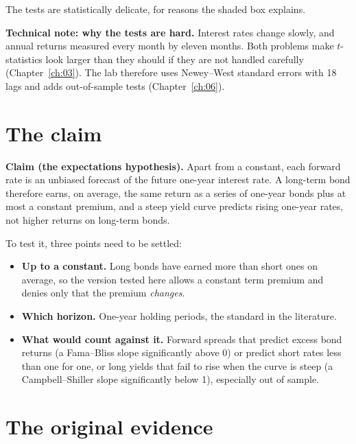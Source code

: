 The tests are statistically delicate, for reasons the shaded box explains.

\begin{technote}
\textbf{Technical note: why the tests are hard.} Interest rates change slowly, and annual returns measured every month  by eleven months. Both problems make $t$-statistics look larger than they should if they are not handled carefully (Chapter~\ref{ch:03}). The lab therefore uses Newey--West standard errors with 18 lags and adds out-of-sample tests (Chapter~\ref{ch:06}).
\end{technote}


\section{The claim}
\label{sec:07-claim}

\begin{callout}
\textbf{Claim (the expectations hypothesis).} Apart from a constant, each forward rate is an unbiased forecast of the future one-year interest rate. A long-term bond therefore earns, on average, the same return as a series of one-year bonds plus at most a constant premium, and a steep yield curve predicts rising one-year rates, not higher returns on long-term bonds.
\end{callout}

To test it, three points need to be settled:

\begin{itemize}
  \item \textbf{Up to a constant.} Long bonds have earned more than short ones on average, so the version tested here allows a constant term premium and denies only that the premium \emph{changes}.
  \item \textbf{Which horizon.} One-year holding periods, the standard in the literature.
  \item \textbf{What would count against it.} Forward spreads that predict excess bond returns (a Fama--Bliss slope significantly above 0) or predict short rates less than one for one, or long yields that fail to rise when the curve is steep (a Campbell--Shiller slope significantly below 1), especially out of sample.
\end{itemize}

\section{The original evidence}
\label{sec:07-evidence}

